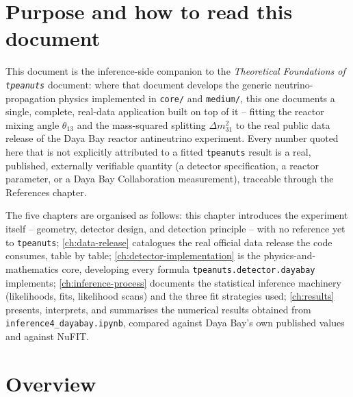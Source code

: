 \label{ch:introduction}

\section{Purpose and how to read this document}

This document is the inference-side companion to the \emph{Theoretical
Foundations of \texttt{tpeanuts}} document: where that document develops the
generic neutrino-propagation physics implemented in \texttt{core/} and
\texttt{medium/}, this one documents a single, complete, real-data
application built on top of it -- fitting the reactor mixing angle
$\theta_{13}$ and the mass-squared splitting $\Delta m^2_{31}$ to the real
public data release of the Daya Bay reactor antineutrino experiment.
Every number quoted here that is not explicitly attributed to a fitted
\texttt{tpeanuts} result is a real, published, externally verifiable
quantity (a detector specification, a reactor parameter, or a Daya Bay
Collaboration measurement), traceable through the References chapter.

The five chapters are organised as follows: this chapter introduces the
experiment itself -- geometry, detector design, and detection principle --
with no reference yet to \texttt{tpeanuts}; \cref{ch:data-release}
catalogues the real official data release the code consumes, table by
table; \cref{ch:detector-implementation} is the physics-and-mathematics
core, developing every formula \texttt{tpeanuts.detector.dayabay}
implements; \cref{ch:inference-process} documents the statistical inference
machinery (likelihoods, fits, likelihood scans) and the three fit
strategies used; \cref{ch:results} presents, interprets, and summarises the
numerical results obtained from \texttt{inference4\_dayabay.ipynb},
compared against Daya Bay's own published values and against NuFIT.

\section{Overview}

